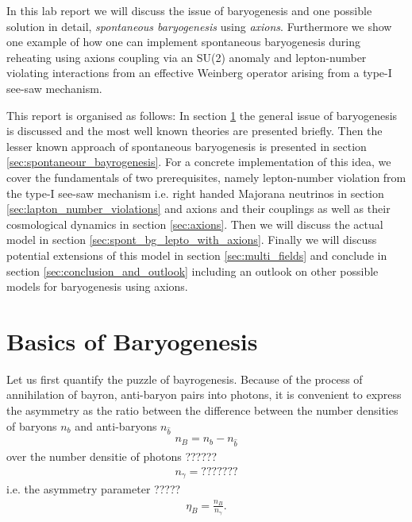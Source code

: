 \documentclass[13pt,a4paper,twoside,titlepage]{article}
\begin{document}
\noindent
In this lab report we will discuss the issue of baryogenesis and one possible solution in detail, \emph{spontaneous baryogenesis} using \emph{axions}. Furthermore we show one example of how one can implement spontaneous baryogenesis during reheating using axions coupling via an SU(2) anomaly and lepton-number violating interactions from an effective Weinberg operator arising from a type-I see-saw mechanism.

\noindent
This report is organised as follows:
In section \ref{sec:baryogenesis} the general issue of baryogenesis is discussed and the most well known theories are presented briefly.
Then the lesser known approach of spontaneous baryogenesis is presented in section \ref{sec:spontaneour_bayrogenesis}.
For a concrete implementation of this idea, we cover the fundamentals of two prerequisites, namely lepton-number violation from the type-I see-saw mechanism i.e. right handed Majorana neutrinos in section \ref{sec:lapton_number_violations} and axions and their couplings as well as their cosmological dynamics in section \ref{sec:axions}. Then we will discuss the actual model in section \ref{sec:spont_bg_lepto_with_axions}.
Finally we will discuss potential extensions of this model in section \ref{sec:multi_fields} and conclude in section \ref{sec:conclusion_and_outlook} including an outlook on other possible models for baryogenesis using axions.

\section{Basics of Baryogenesis}
\label{sec:baryogenesis}


Let us first quantify the puzzle of bayrogenesis. Because of the process of annihilation of
bayron, anti-baryon pairs into photons, it is convenient to express the asymmetry as
the ratio between the difference between the number densities of baryons $n_b$ and anti-baryons $n_{\hat{b}}$
\begin{align}
    n_B = n_b - n_{\hat{b}}
\end{align}
over the number densitie of photons  ??????
\begin{align}
    n_\gamma = ???????
\end{align}
i.e. the asymmetry parameter ?????
\begin{align}
    \eta_B = \frac{n_B}{n_\gamma}.
\end{align}
\end{document}
